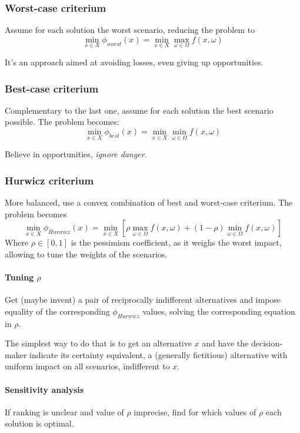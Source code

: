 \subsubsection{Worst-case criterium}

Assume for each solution the worst scenario, reducing the problem to
$$ \min_{x \in X} \phi_{worst} (x) = \min_{x \in X} \max_{\omega \in \Omega} f(x, \omega) $$

It's an approach aimed at avoiding losses, even giving up opportunities. 

\subsubsection{Best-case criterium}

Complementary to the last one, assume for each solution the best scenario possible. The problem becomes: 
$$ \min_{x \in X} \phi_{best} (x) = \min_{x \in X} \min_{\omega \in \Omega} f(x, \omega) $$

Believe in opportunities, \textit{ignore danger}.

\subsubsection{Hurwicz criterium}

More balanced, use a convex combination of best and worst-case criterium. The problem becomes
$$ \min_{x \in X} \phi_{Hurwicz} (x) = \min_{x \in X} \left[\rho \max_{\omega \in \Omega} f(x, \omega) + (1 - \rho) \min_{\omega \in \Omega} f(x, \omega) \right]$$
Where $\rho \in [0,1]$ is the pessimism coefficient, as it weighs the worst impact, allowing to tune the weights of the scenarios.

\paragraph{Tuning $\rho$} Get (maybe invent) a pair of reciprocally indifferent alternatives and impose equality of the corresponding $\phi_{Hurwicz}$ values, solving the corresponding equation in $\rho$.

The simplest way to do that is to get an alternative $x$ and have the decision-maker indicate its certainty equivalent, a (generally fictitious) alternative with uniform impact on all scenarios, indifferent to $x$.

\paragraph{Sensitivity analysis} If ranking is unclear and value of $\rho$ imprecise, find for which values of $\rho$ each solution is optimal.

